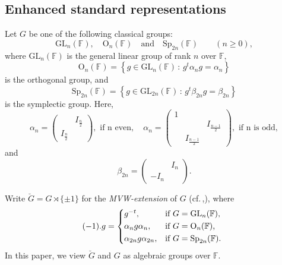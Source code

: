 \documentclass[12pt]{amsart}
\theoremstyle{definition}
\theoremstyle{remark}\newtheorem{rmk}[lm]{Remark}
\newcommand{\RO}{{\mathrm {O}}}
\newcommand{\GL}{{\mathrm{GL}}}
\newcommand{\Sp}{{\mathrm{Sp}}}
\newcommand{\C}{\mathbb{F}}
\renewcommand{\mid}{\,:\,}
\begin{document}
	\subsection{Enhanced standard representations} \label{sec:enrepn}
 Let $G$ be one of the following classical groups:
	\begin{equation}
    \label{eq:classicalgroups}
		\GL_n(\C),\quad\RO_n(\C)\quad\text{and}\quad\Sp_{2n}(\C)\qquad (n\ge 0),
	\end{equation}
	where $\GL_n(\C)$ is the general linear group of rank $n$ over $\C$, 
	\begin{equation*}
		\RO_n(\C)=\left\{g\in\GL_n(\C)\mid g^t\alpha_ng=\alpha_n\right\}
	\end{equation*}
    is the orthogonal group, 
	and
	\begin{equation*}
		\Sp_{2n}(\C)=\left\{g\in\GL_{2n}(\C)\mid g^t\beta_{2n}g=\beta_{2n}\right\}
	\end{equation*}
    is the symplectic group. Here,
    \begin{equation*}
        \alpha_{n}=\left(\begin{matrix}
				&I_{\frac{n}{2}}\\I_{\frac{n}{2}}&
			\end{matrix}\right),\text{ if n even},\quad\alpha_n=
            \left(\begin{matrix}
				1&&\\&&I_{\frac{n-1}{2}}\\&I_{\frac{n-1}{2}}&
			\end{matrix}\right),\text{ if n is odd},
    \end{equation*}
    and
    \begin{equation*}
        \beta_{2n}=\left(\begin{matrix}
			&I_n\\-I_n&
		\end{matrix}\right).
    \end{equation*}
    
    Write $\breve{G}=G\rtimes\{\pm 1\}$ for the \emph{MVW-extension} of $G$ (cf.\,\cite{MVW},\cite{Sun}), where 
    \begin{equation*}
   (-1).g   = \begin{cases*} 
   g^{-t}, & if $G=\GL_n(\C)$,\\
   \alpha_{n}g\alpha_{n},& if $G=\RO_n(\C)$,\\
\alpha_{2n}g\alpha_{2n}, & if $G=\Sp_{2n}(\C)$. 
        \end{cases*}
    \end{equation*}
    In this paper, we view $\breve{G}$ and $G$ as algebraic groups over $\C$. 
\end{document}
